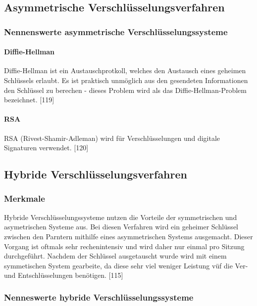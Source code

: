 \documentclass[12pt,a4paper]{report}
\begin{document}
\begin{onehalfspace}
\subsection{Asymmetrische Verschlüsselungsverfahren}

\subsubsection{Nennenswerte asymmetrische Verschlüsselungssysteme}

\paragraph{Diffie-Hellman}

Diffie-Hellman ist ein Austauschprotkoll, welches den Austausch eines geheimen Schlüssels erlaubt. Es ist praktisch unmöglich aus den gesendeten Informationen den Schlüssel zu berechen - dieses Problem wird als das Diffie-Hellman-Problem bezeichnet. [119]

\paragraph{RSA}

RSA (Rivest-Shamir-Adleman) wird für Verschlüsselungen und digitale Signaturen verwendet. [120]

\subsection{Hybride Verschlüsselungsverfahren}

\subsubsection{Merkmale}

Hybride Verschlüsselungssysteme nutzen die Vorteile der symmetrischen und asymetrischen Systeme aus. Bei diesen Verfahren wird ein geheimer Schlüssel zwischen den Parntern mithilfe eines asymmetrischen Systems ausgemacht. Dieser Vorgang ist oftmals sehr rechenintensiv und wird daher nur einmal pro Sitzung durchgeführt. Nachdem der Schlüssel ausgetauscht wurde wird mit einem symmetischen System gearbeite, da diese sehr viel weniger Leistung vüf die Ver- und Entschlüsselungen benötigen. [115]

\subsubsection{Nenneswerte hybride Verschlüsselungssysteme}


\end{onehalfspace}
\end{document}
